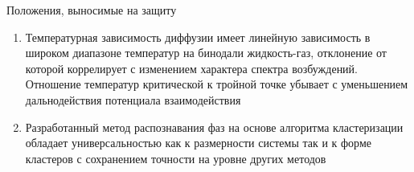 \documentclass{beamer} %
\begin{document}
\begin{frame}{Положения, выносимые на защиту}
  \footnotesize{

    \begin{enumerate}
    \item Температурная зависимость диффузии имеет линейную зависимость в широком диапазоне температур на бинодали жидкость-газ, отклонение от которой коррелирует с изменением характера спектра возбуждений. Отношение температур критической к тройной точке убывает с уменьшением дальнодействия потенциала взаимодействия
    \item Разработанный метод распознавания фаз на основе алгоритма кластеризации обладает универсальностью как к размерности системы так и к форме кластеров с сохранением точности на уровне других методов
    \end{enumerate}
  }
\end{frame}
\end{document}
